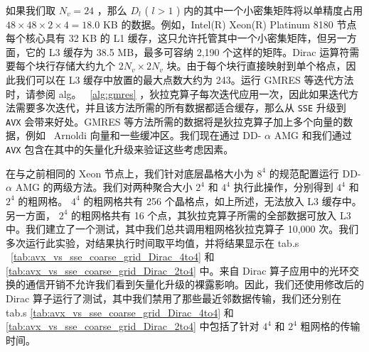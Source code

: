 \documentclass[5p,times,a4paper,fleqn]{cas-dc}
\begin{document}
如果我们取    $N_{v}=24$    ，那么    $D_{l}$    (    $l>1$    ) 内的其中一个小密集矩阵将以单精度占用    $48 \times 48 \times 2 \times 4 = 18.0$    KB 的数据。例如，Intel(R) Xeon(R) Platinum 8180 节点每个核心具有 32 KB 的 L1 缓存，这只允许托管其中一个小密集矩阵，但另一方面，它的 L3 缓存为 38.5 MB，最多可容纳 2,190 个这样的矩阵。Dirac 运算符需要每个块行存储大约九个    $2N_{v} \times 2N_{v}$    块。由于每个块行直接映射到单个格点，因此我们可以在 L3 缓存中放置的最大点数大约为 243。运行 GMRES 等迭代方法时，请参阅 alg。 \     \ref{alg:gmres}    ，狄拉克算子每次迭代应用一次，因此如果迭代方法需要多次迭代，并且该方法所需的所有数据都适合缓存，那么从    \texttt{SSE}    升级到    \texttt{AVX}    会带来好处。GMRES 等方法所需的数据将是狄拉克算子加上多个向量的数据，例如 \  Arnoldi 向量和一些缓冲区。我们现在通过 DD-    $\alpha$    AMG 和我们通过    \texttt{AVX}    包含在其中的矢量化升级来验证这些考虑因素。  

在与之前相同的 Xeon 节点上，我们针对底层晶格大小为    $8^4$    的规范配置运行 DD-    $\alpha$    AMG 的两级方法。我们对两种聚合大小    $2^4$    和    $4^4$    执行此操作，分别得到    $4^4$    和    $2^4$    的粗网格。   $4^4$    的粗网格共有 256 个晶格点，如上所述，无法放入 L3 缓存中。另一方面，   $2^4$    的粗网格共有 16 个点，其狄拉克算子所需的全部数据可放入 L3 中。我们建立了一个测试，其中我们总共调用粗网格狄拉克算子 10,000 次。我们多次运行此实验，对结果执行时间取平均值，并将结果显示在 tab.s \     \ref{tab:avx_vs_sse_coarse_grid_Dirac_4to4}    和    \ref{tab:avx_vs_sse_coarse_grid_Dirac_2to4}    中。来自 Dirac 算子应用中的光环交换的通信开销不允许我们看到矢量化升级的裸露影响。因此，我们还使用修改后的 Dirac 算子运行了测试，其中我们禁用了那些最近邻数据传输，我们还分别在 tab.s    \ref{tab:avx_vs_sse_coarse_grid_Dirac_4to4}    和    \ref{tab:avx_vs_sse_coarse_grid_Dirac_2to4}    中包括了针对    $4^4$    和    $2^4$    粗网格的传输时间。  
\end{document}
